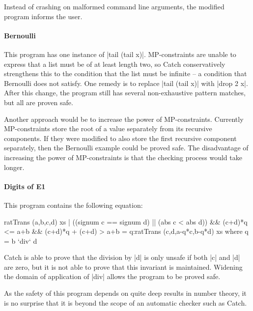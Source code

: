 
Instead of crashing on malformed command line arguments, the modified program informs the user.

\paragraph{Bernoulli}

This program has one instance of |tail (tail x)|. MP-constraints are unable to express that a list must be of at least length two, so Catch conservatively strengthens this to the condition that the list must be infinite -- a condition that Bernoulli does not satisfy. One remedy is to replace |tail (tail x)| with |drop 2 x|. After this change, the program still has several non-exhaustive pattern matches, but all are proven safe.

Another approach would be to increase the power of MP-constraints. Currently MP-constraints store the root of a value separately from its recursive components. If they were modified to also store the first recursive component separately, then the Bernoulli example could be proved safe. The disadvantage of increasing the power of MP-constraints is that the checking process would take longer.

\paragraph{Digits of E1}

This program contains the following equation:

\begin{code}
ratTrans (a,b,c,d) xs |
  ((signum c == signum d) || (abs c < abs d)) &&
  (c+d)*q <= a+b && (c+d)*q + (c+d) > a+b
     = q:ratTrans (c,d,a-q*c,b-q*d) xs
  where q = b `div` d
\end{code}

\noindent Catch is able to prove that the division by |d| is only unsafe if both |c| and |d| are zero, but it is not able to prove that this invariant is maintained. Widening the domain of application of |div| allows the program to be proved safe.

As the safety of this program depends on quite deep results in number theory, it is no surprise that it is beyond the scope of an automatic checker such as Catch.

